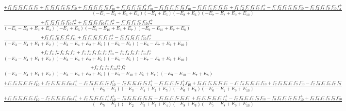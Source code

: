 \documentclass{article}
\begin{document}
\[\begin{array}{rcl}
\frac{+f_{1}^{-}f_{2}^{-}f_{3}^{-}f_{7}^{-}f_{8}^{-}f_{9}^{-}+f_{1}^{-}f_{3}^{-}f_{4}^{-}f_{8}^{-}f_{9}^{-}f_{10}^{-}+f_{1}^{-}f_{2}^{-}f_{3}^{-}f_{7}^{-}f_{8}^{-}f_{10}^{+}+f_{1}^{-}f_{2}^{-}f_{7}^{-}f_{8}^{-}f_{4}^{+}f_{10}^{+}-f_{1}^{-}f_{3}^{-}f_{4}^{-}f_{7}^{-}f_{8}^{-}f_{10}^{+}-f_{1}^{-}f_{3}^{-}f_{4}^{-}f_{7}^{-}f_{8}^{-}f_{9}^{-}+f_{1}^{-}f_{2}^{-}f_{7}^{-}f_{8}^{-}f_{9}^{-}f_{4}^{+}-f_{1}^{-}f_{2}^{-}f_{3}^{-}f_{8}^{-}f_{9}^{-}f_{10}^{-}-f_{1}^{-}f_{2}^{-}f_{8}^{-}f_{9}^{-}f_{10}^{-}f_{4}^{+}}{(-E_{1}-E_{2}+E_{3}+E_{4})(-E_{1}+E_{5})(-E_{8}+E_{6})(-E_{7}-E_{8}+E_{9}+E_{10})}\\
\frac{+f_{1}^{-}f_{2}^{-}f_{3}^{-}f_{9}^{-}f_{10}^{-}f_{7}^{+}+f_{1}^{-}f_{2}^{-}f_{9}^{-}f_{10}^{-}f_{4}^{+}f_{7}^{+}-f_{1}^{-}f_{3}^{-}f_{4}^{-}f_{9}^{-}f_{10}^{-}f_{7}^{+}}{(-E_{1}-E_{2}+E_{3}+E_{4})(-E_{1}+E_{5})(-E_{9}-E_{10}+E_{6}+E_{7})(-E_{9}-E_{10}+E_{7}+E_{8})}\\
\frac{+f_{3}^{-}f_{4}^{-}f_{6}^{-}f_{7}^{-}f_{2}^{+}f_{10}^{+}+f_{3}^{-}f_{4}^{-}f_{6}^{-}f_{7}^{-}f_{9}^{-}f_{2}^{+}-f_{3}^{-}f_{4}^{-}f_{6}^{-}f_{9}^{-}f_{10}^{-}f_{2}^{+}}{(-E_{3}-E_{4}+E_{1}+E_{2})(-E_{3}-E_{4}+E_{2}+E_{5})(-E_{6}+E_{8})(-E_{6}-E_{7}+E_{9}+E_{10})}\\
\frac{+f_{3}^{-}f_{4}^{-}f_{7}^{-}f_{8}^{-}f_{9}^{-}f_{2}^{+}+f_{3}^{-}f_{4}^{-}f_{7}^{-}f_{8}^{-}f_{2}^{+}f_{10}^{+}-f_{3}^{-}f_{4}^{-}f_{8}^{-}f_{9}^{-}f_{10}^{-}f_{2}^{+}}{(-E_{3}-E_{4}+E_{1}+E_{2})(-E_{3}-E_{4}+E_{2}+E_{5})(-E_{8}+E_{6})(-E_{7}-E_{8}+E_{9}+E_{10})}\\
\frac{+f_{3}^{-}f_{4}^{-}f_{9}^{-}f_{10}^{-}f_{2}^{+}f_{7}^{+}}{(-E_{3}-E_{4}+E_{1}+E_{2})(-E_{3}-E_{4}+E_{2}+E_{5})(-E_{9}-E_{10}+E_{6}+E_{7})(-E_{9}-E_{10}+E_{7}+E_{8})}\\
\frac{+f_{3}^{-}f_{4}^{-}f_{5}^{-}f_{6}^{-}f_{7}^{-}f_{10}^{+}+f_{2}^{-}f_{5}^{-}f_{6}^{-}f_{9}^{-}f_{10}^{-}f_{4}^{+}-f_{2}^{-}f_{3}^{-}f_{5}^{-}f_{6}^{-}f_{7}^{-}f_{10}^{+}-f_{2}^{-}f_{5}^{-}f_{6}^{-}f_{7}^{-}f_{9}^{-}f_{4}^{+}-f_{2}^{-}f_{5}^{-}f_{6}^{-}f_{7}^{-}f_{4}^{+}f_{10}^{+}+f_{3}^{-}f_{4}^{-}f_{5}^{-}f_{6}^{-}f_{7}^{-}f_{9}^{-}-f_{3}^{-}f_{4}^{-}f_{5}^{-}f_{6}^{-}f_{9}^{-}f_{10}^{-}+f_{2}^{-}f_{3}^{-}f_{5}^{-}f_{6}^{-}f_{9}^{-}f_{10}^{-}-f_{2}^{-}f_{3}^{-}f_{5}^{-}f_{6}^{-}f_{7}^{-}f_{9}^{-}}{(-E_{5}+E_{1})(-E_{3}-E_{4}+E_{2}+E_{5})(-E_{6}+E_{8})(-E_{6}-E_{7}+E_{9}+E_{10})}\\
\frac{+f_{2}^{-}f_{3}^{-}f_{5}^{-}f_{7}^{-}f_{8}^{-}f_{10}^{+}-f_{2}^{-}f_{5}^{-}f_{8}^{-}f_{9}^{-}f_{10}^{-}f_{4}^{+}+f_{2}^{-}f_{5}^{-}f_{7}^{-}f_{8}^{-}f_{4}^{+}f_{10}^{+}-f_{3}^{-}f_{4}^{-}f_{5}^{-}f_{7}^{-}f_{8}^{-}f_{9}^{-}+f_{2}^{-}f_{3}^{-}f_{5}^{-}f_{7}^{-}f_{8}^{-}f_{9}^{-}+f_{2}^{-}f_{5}^{-}f_{7}^{-}f_{8}^{-}f_{9}^{-}f_{4}^{+}-f_{2}^{-}f_{3}^{-}f_{5}^{-}f_{8}^{-}f_{9}^{-}f_{10}^{-}-f_{3}^{-}f_{4}^{-}f_{5}^{-}f_{7}^{-}f_{8}^{-}f_{10}^{+}+f_{3}^{-}f_{4}^{-}f_{5}^{-}f_{8}^{-}f_{9}^{-}f_{10}^{-}}{(-E_{5}+E_{1})(-E_{2}-E_{5}+E_{3}+E_{4})(-E_{8}+E_{6})(-E_{7}-E_{8}+E_{9}+E_{10})}\\

\end{array}\]
\end{document}
